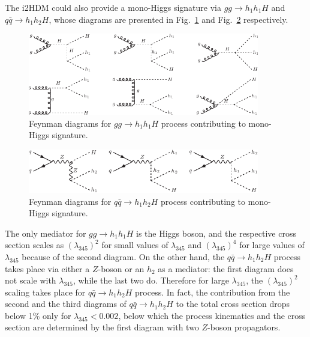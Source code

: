 \documentclass[12pt,a4paper]{article}
\providecommand{\DIFaddbegin}{} %
\providecommand{\DIFdelbegin}{} %
\providecommand{\DIFdelend}{} %
\providecommand{\DIFaddbeginFL}{} %
\providecommand{\DIFaddendFL}{} %
\begin{document}
The i2HDM could also provide a mono-Higgs signature
via $gg\to  h_1 h_1 H$ and $q\bar{q} \to  h_1 h_2H$,
whose diagrams are presented in Fig.~\ref{fig:fd-mono-H1}
and Fig.~\ref{fig:fd-mono-H2} respectively.
%
\DIFdelbegin %
\DIFdelend \DIFaddbegin \begin{figure}[h!]
\begin{center}
\includegraphics[width=0.9\textwidth]{fd-mono-h1.pdf} 
\DIFaddendFL \caption{Feynman diagrams for $gg\to h_1 h_1H$  process 
contributing to mono-Higgs signature.}
\label{fig:fd-mono-H1}
\DIFaddbeginFL \end{center}
\DIFaddendFL \end{figure}
\DIFdelbegin %
\DIFdelend \DIFaddbegin \begin{figure}[h!]
\begin{center}
\includegraphics[width=0.9\textwidth]{fd-mono-h2.pdf} 
\DIFaddendFL \caption{Feynman diagrams for $q\bar{q}\to h_1 h_2H$  process 
  contributing to mono-Higgs signature.}
\label{fig:fd-mono-H2}
\DIFaddbeginFL \end{center}
\DIFaddendFL \end{figure}
The only mediator for $gg\to  h_1 h_1 H$ is the Higgs boson,
and the respective cross section scales as $(\lambda_{345})^2$
for small values of $\lambda_{345}$ 
and $(\lambda_{345})^4$ for large values of $\lambda_{345}$
because of the second diagram.
On the other hand, the $q\bar{q}\to h_1 h_2H$  process 
takes place via either a $Z$-boson or an $h_2$ as a mediator:
the first diagram does not scale with $\lambda_{345}$,
while the last two do. Therefore for large $\lambda_{345}$,
the $(\lambda_{345})^2$  scaling takes place for $q\bar{q}\to h_1 h_2H$ process.
In fact,  the contribution from the second and 
the third  diagrams of  $q\bar{q}\to h_1 h_2H$
to the total cross section
drops below 1\% only for $\lambda_{345}<0.002$,
below which the process kinematics and the cross section 
are determined by the first diagram with two $Z$-boson propagators.
\end{document}
